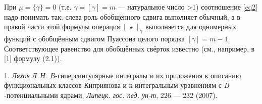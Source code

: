  При $\mu=\{\gamma\}=0$ (т.е. $\gamma=[\gamma]=m$ --- натуральное число >1) соотношение \eqref{eq2} надо понимать так:
 слева роль обобщённого сдвига выполняет обычный,
 а в правой части этой формулы операция $[\,\star\,]_\gamma$
 выполняется для одномерных функций с обобщённым сдвигом Пуассона целого порядка $[\gamma]=m-1$.
 Соответствующее равенство для обобщённых свёрток известно   (см., например,  в [1] формулу (2.1)).

\litlist

1. {\it Ляхов Л.\,Н.} $B$-гиперсингулярные интегралы и их приложения к описанию функциональных классов Киприянова и к интегральным уравнениям с $B$-потенциальными ядрами,  {\it Липецк. гос. пед. ун-т}, 226 --- 232 (2007).

